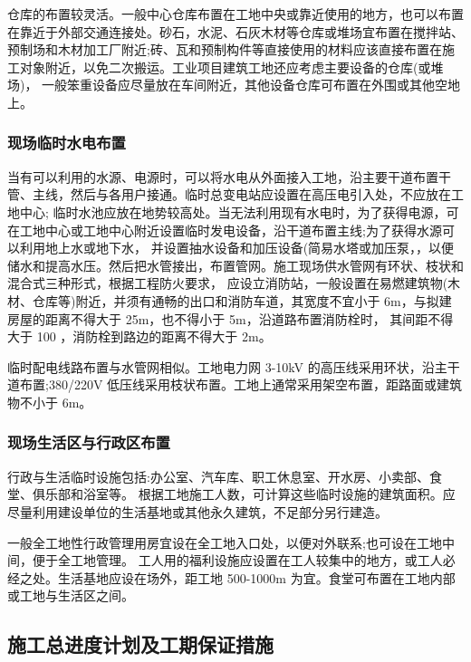 \setlength{\baselineskip}{20pt}
仓库的布置较灵活。一般中心仓库布置在工地中央或靠近使用的地方，也可以布置在靠近于外部交通连接处。砂石，水泥、石灰木材等仓库或堆场宜布置在搅拌站、
预制场和木材加工厂附近;砖、瓦和预制构件等直接使用的材料应该直接布置在施工对象附近，以免二次搬运。工业项目建筑工地还应考虑主要设备的仓库(或堆场)，
一般笨重设备应尽量放在车间附近，其他设备仓库可布置在外围或其他空地上。

\subsubsection{现场临时水电布置}

\setlength{\baselineskip}{20pt}
当有可以利用的水源、电源时，可以将水电从外面接入工地，沿主要干道布置干管、主线，然后与各用户接通。临时总变电站应设置在高压电引入处，不应放在工地中心;
临时水池应放在地势较高处。当无法利用现有水电时，为了获得电源，可在工地中心或工地中心附近设置临时发电设备，沿干道布置主线;为了获得水源可以利用地上水或地下水，
并设置抽水设备和加压设备(简易水塔或加压泵，，以便储水和提高水压。然后把水管接出，布置管网。施工现场供水管网有环状、枝状和混合式三种形式，根据工程防火要求，
应设立消防站，一般设置在易燃建筑物(木材、仓库等)附近，并须有通畅的出口和消防车道，其宽度不宜小于 6m，与拟建房屋的距离不得大于 25m，也不得小于 5m，沿道路布置消防栓时，
其间距不得大于 100 ，消防栓到路边的距离不得大于 2m。

临时配电线路布置与水管网相似。工地电力网 3-10kV 的高压线采用环状，沿主干道布置;380/220V 低压线采用枝状布置。工地上通常采用架空布置，距路面或建筑物不小于 6m。

\subsubsection{现场生活区与行政区布置}

\setlength{\baselineskip}{20pt}
行政与生活临时设施包括:办公室、汽车库、职工休息室、开水房、小卖部、食堂、俱乐部和浴室等。
根据工地施工人数，可计算这些临时设施的建筑面积。应尽量利用建设单位的生活基地或其他永久建筑，不足部分另行建造。

一般全工地性行政管理用房宜设在全工地入口处，以便对外联系;也可设在工地中间，便于全工地管理。
工人用的福利设施应设置在工人较集中的地方，或工人必经之处。生活基地应设在场外，距工地 500-1000m 为宜。食堂可布置在工地内部或工地与生活区之间。

\subsection{施工总进度计划及工期保证措施}
